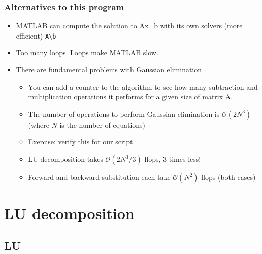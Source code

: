 \documentclass[11pt,table,final,xcolor={usenames,dvipsnames,table}]{beamer}
\begin{document}
\begin{frame}[fragile]
  \frametitle{Alternatives to this program}
  \begin{itemize}
    \item MATLAB can compute the solution to Ax=b with its own solvers (more efficient) \lstinline$A\b$
    \item Too many loops. Loops make MATLAB slow.
    \item There are fundamental problems with Gaussian elimination\pause
    \begin{itemize}
      \item You can add a counter to the algorithm to see how many subtraction and multiplication operations it performs for a given size of matrix A.
      \item The number of operations to perform Gaussian elimination is $\mathcal{O}(2N^3)$ (where $N$ is the number of equations) 
      \item Exercise: verify this for our script \pause
      \item LU decomposition takes $\mathcal{O}(2N^3/3)$ flops, 3 times less!
      \item Forward and backward substitution each take $\mathcal{O}(N^2)$
flops (both cases) 
    \end{itemize}
  \end{itemize}
\end{frame}

\section{LU decomposition}
\subsection*{LU}
\end{document}

